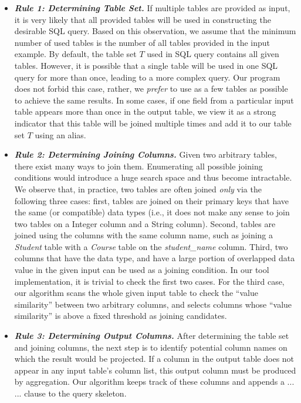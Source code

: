\begin{itemize}

\item \textit{\textbf{Rule 1: Determining Table Set.}} If multiple tables are provided as input, it is very likely that all
provided tables will be used in constructing the desirable SQL query. Based on this observation, we assume that
the minimum number of used tables is the number of all tables provided in the input example. By default, the
table set $T$ used in SQL query contains all given tables. However, it is
possible that a single table will be used in one SQL query for more than once, leading to a more complex query.
Our program does not forbid this case, rather, we \textit{prefer} to use as a few tables as possible to achieve
the same results. In some cases, if one field from a particular input table appears more than once in the
output table, we view it as a strong indicator that this table will be joined multiple times and add it to our table
set $T$ using an alias.


\item \textit{\textbf{Rule 2: Determining Joining Columns. }} Given two arbitrary tables, there exist many
ways to join them. Enumerating all possible joining conditions would introduce a huge search space and thus
become intractable. We observe that, in practice, two tables are often joined \textit{only} via the following
three cases: first, tables are joined on their primary keys that have the same (or compatible) data types (i.e., it does not
make any sense to join two tables on a Integer column and a String column). Second, tables are joined
using the columns with the same column name, such as joining a \textit{Student} table with a \textit{Course} table on the
\textit{student\_name} column. Third, two columns that have the data type, and have a large portion of
overlapped data value in the given input can be used as a joining condition. In our tool implementation, it is trivial to check the first 
two cases. For the third case, our algorithm scans the whole given input table to check the ``value similarity''
between two arbitrary columns, and selects columns whose ``value similarity'' is above a fixed threshold as joining candidates.

\item \textit{\textbf{Rule 3: Determining Output Columns.}} After determining the table set and joining columns,
the next step is to identify potential column names on which the result would be projected. If a
column in the output table  does not appear in any input table's column list, this output column must
be produced by aggregation. Our algorithm keeps track of these columns and appends a  ...  ...
clause to the query skeleton.

\end{itemize}

